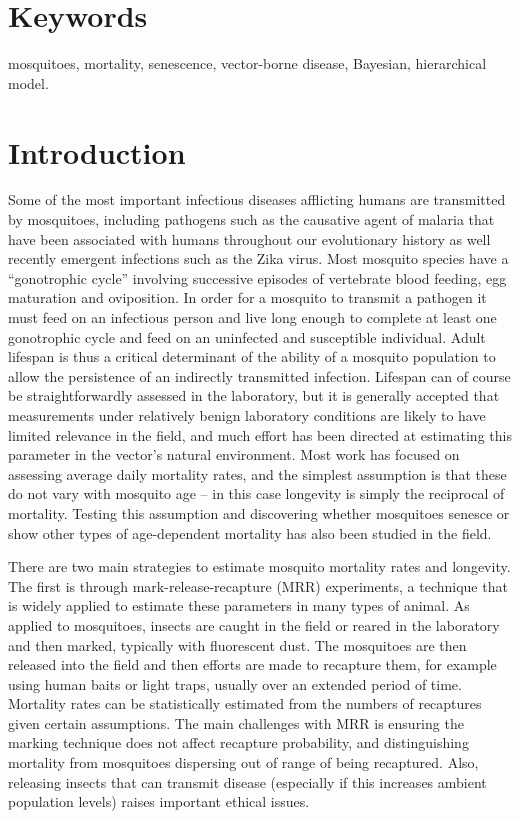 \documentclass[]{article}
\begin{document}
\section{Keywords}\label{keywords}

mosquitoes, mortality, senescence, vector-borne disease, Bayesian,
hierarchical model.

\section{Introduction}\label{introduction}

Some of the most important infectious diseases afflicting humans are
transmitted by mosquitoes, including pathogens such as the causative
agent of malaria that have been associated with humans throughout our
evolutionary history as well recently emergent infections such as the
Zika virus. Most mosquito species have a ``gonotrophic cycle'' involving
successive episodes of vertebrate blood feeding, egg maturation and
oviposition. In order for a mosquito to transmit a pathogen it must feed
on an infectious person and live long enough to complete at least one
gonotrophic cycle and feed on an uninfected and susceptible individual.
Adult lifespan is thus a critical determinant of the ability of a
mosquito population to allow the persistence of an indirectly
transmitted infection. Lifespan can of course be straightforwardly
assessed in the laboratory, but it is generally accepted that
measurements under relatively benign laboratory conditions are likely to
have limited relevance in the field, and much effort has been directed
at estimating this parameter in the vector's natural environment. Most
work has focused on assessing average daily mortality rates, and the
simplest assumption is that these do not vary with mosquito age -- in
this case longevity is simply the reciprocal of mortality. Testing this
assumption and discovering whether mosquitoes senesce or show other
types of age-dependent mortality has also been studied in the field.

There are two main strategies to estimate mosquito mortality rates and
longevity. The first is through mark-release-recapture (MRR)
experiments, a technique that is widely applied to estimate these
parameters in many types of animal. As applied to mosquitoes, insects
are caught in the field or reared in the laboratory and then marked,
typically with fluorescent dust. The mosquitoes are then released into
the field and then efforts are made to recapture them, for example using
human baits or light traps, usually over an extended period of time.
Mortality rates can be statistically estimated from the numbers of
recaptures given certain assumptions. The main challenges with MRR is
ensuring the marking technique does not affect recapture probability,
and distinguishing mortality from mosquitoes dispersing out of range of
being recaptured. Also, releasing insects that can transmit disease
(especially if this increases ambient population levels) raises
important ethical issues.
\end{document}
